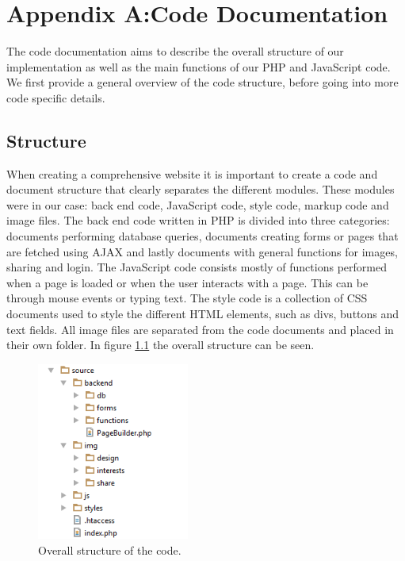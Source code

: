 \chapter{Appendix A:\newline Code Documentation}
\label{apx:Code}

The code documentation aims to describe the overall structure of our implementation as well as the main functions of our PHP and JavaScript code. We first provide a general overview of the code structure, before going into more code specific details. 

\section{Structure}
\label{sec:CodeStructure}
When creating a comprehensive website it is important to create a code and document structure that clearly separates the different modules. These modules were in our case: back end code, JavaScript code, style code, markup code and image files. The back end code written in PHP is divided into three categories: documents performing database queries, documents creating forms or pages that are fetched using AJAX and lastly documents with general functions for images, sharing and login. The JavaScript code consists mostly of functions performed when a page is loaded or when the user interacts with a page. This can be through mouse events or typing text. The style code is a collection of CSS documents used to style the different HTML elements, such as divs, buttons and text fields. All image files are separated from the code documents and placed in their own folder. In figure \ref{fig:CodeStructureStruc} the overall structure can be seen.

\begin{figure}[ht!]
  \centering
  \includegraphics[width=50mm]{./Appendix/CodeDocumentation/img/structure}
  \caption{Overall structure of the code.}
  \label{fig:CodeStructureStruc}
\end{figure}

